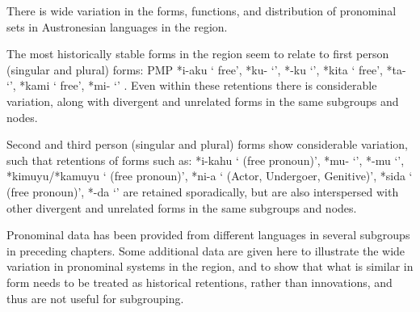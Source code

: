 There is wide variation in the forms,
functions, and distribution of pronominal sets in Austronesian
languages in the region.

The most historically stable forms in the region seem to relate
to first person (singular
and plural) forms: PMP *i-aku ‘ free’,
*ku- ‘’, *-ku ‘’,
*kita ‘ free’, *ta- ‘’,
*kami ‘ free’, *mi- ‘’
\citep{AdelaarHajek2024}.
Even within these retentions there is considerable variation,
along with divergent and unrelated forms in the same subgroups and nodes.

Second and third person (singular
and plural) forms show considerable variation,
such that retentions of forms such as: *i-kahu ‘ (free pronoun)’,
*mu- ‘’, *-mu ‘’,
*kimuyu/*kamuyu ‘ (free pronoun)’, *ni-a ‘ (Actor,
Undergoer, Genitive)’, *sida ‘ (free pronoun)’, *-da ‘’
are retained sporadically, but are also interspersed with other divergent
and unrelated forms in the same subgroups and nodes.

Pronominal data has been provided from different languages in
several subgroups in preceding chapters.
Some additional data are given here to illustrate the wide variation
in pronominal systems in the region,
and to show that what is similar in form needs to
be treated as historical retentions,
rather than innovations, and thus are not useful for subgrouping.

